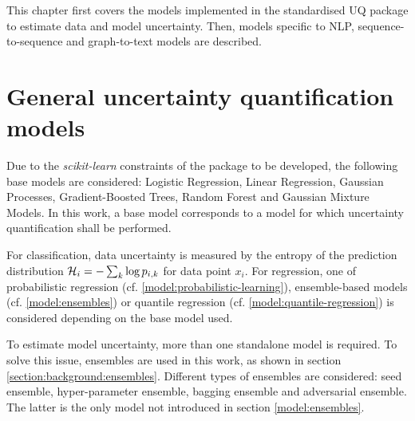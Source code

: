 




This chapter first covers the models implemented in the standardised UQ package to estimate data and model uncertainty. Then, models specific to NLP, sequence-to-sequence and graph-to-text models are described.  


\section{General uncertainty quantification models} \label{design:uq-models}

Due to the \textit{scikit-learn} constraints of the package to be developed, the following base models are considered: Logistic Regression, Linear Regression, Gaussian Processes, Gradient-Boosted Trees, Random Forest and  Gaussian Mixture Models. In this work, a base model corresponds to a model for which uncertainty quantification shall be performed. 


For classification, data uncertainty is measured by the entropy of the prediction distribution $\operatorname{\mathcal{H}}_i = - \sum_k \log p_{i,k}$ for data point $x_i$. For regression, one of probabilistic regression (cf. \ref{model:probabilistic-learning}), ensemble-based models (cf. \ref{model:ensembles}) or quantile regression (cf. \ref{model:quantile-regression}) is considered depending on the base model used. 

To estimate model uncertainty, more than one standalone model is required. To solve this issue, ensembles are used in this work, as shown in section \ref{section:background:ensembles}. Different types of ensembles are considered: seed ensemble, hyper-parameter ensemble, bagging ensemble and adversarial ensemble. The latter is the only model not introduced in section \ref{model:ensembles}.

